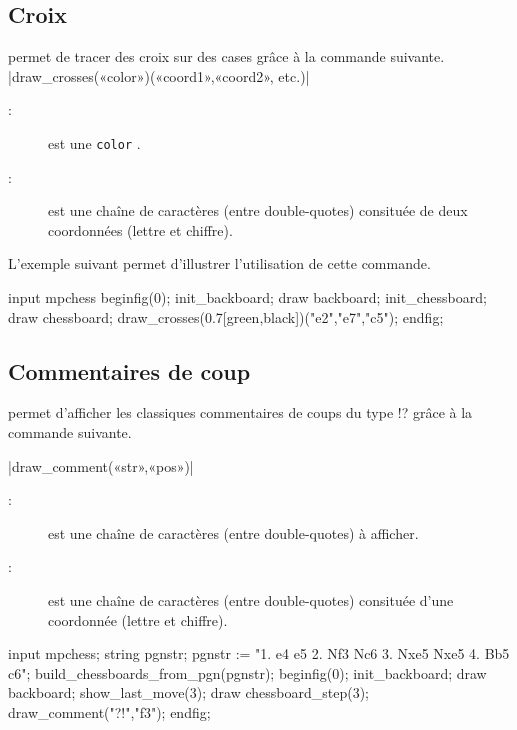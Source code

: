 \documentclass[french]{ltxdoc}
\begin{document}
\subsection{Croix}


\mpchess permet de tracer des croix sur des cases  grâce à la commande
suivante.
\commande|draw_crosses(«color»)(«coord1»,«coord2», etc.)|\smallskip

\begin{description}
  \item[:] est une \lstinline+color+ \MP.
  \item[:] est une chaîne de caractères (entre double-quotes) consituée de deux coordonnées (lettre et chiffre).
  \end{description}

L’exemple suivant permet d’illustrer l’utilisation de cette commande.

\begin{ExempleMP}
input mpchess
beginfig(0);
init_backboard;
draw backboard;
init_chessboard;
draw chessboard;
draw_crosses(0.7[green,black])("e2","e7","c5");
endfig;
\end{ExempleMP}

\subsection{Commentaires de coup}

\mpchess permet d’afficher les classiques commentaires de coups du type
\og{}!?\fg{} grâce à la commande suivante.

\commande|draw_comment(«str»,«pos»)|\smallskip

\begin{description}
\item[:] est une chaîne de caractères (entre double-quotes) à
afficher. 
\item[:] est une chaîne de caractères (entre double-quotes) consituée
d’une coordonnée (lettre et chiffre). 
\end{description}

\begin{ExempleMP}
input mpchess;
string pgnstr;
pgnstr := "1. e4 e5 2. Nf3 Nc6 3. Nxe5 Nxe5 4. Bb5 c6";
build_chessboards_from_pgn(pgnstr);
beginfig(0);
init_backboard;
draw backboard;
show_last_move(3);
draw chessboard_step(3); %
draw_comment("?!","f3");
endfig;
\end{ExempleMP}
\end{document}
